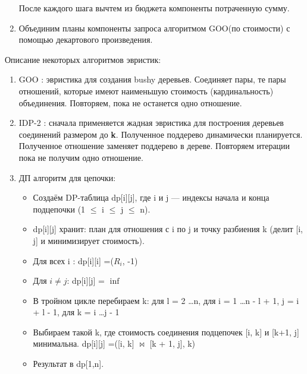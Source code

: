 \documentclass[12pt]{article}
\begin{document}
\begin{flushleft}
\begin{enumerate}
    После каждого шага вычтем из бюджета компоненты потраченную сумму.
    \item Объединим планы компоненты запроса алгоритмом GOO(по стоимости) с помощью декартового произведения.
\end{enumerate}


Описание некоторых алгоритмов эвристик:
\begin{enumerate}
    \item GOO \cite{MoerGOO}: эвристика для создания bushy деревьев. Соединяет пары, те пары отношений, которые имеют наименьшую стоимость (кардинальность) объединения. 
    Повторяем, пока не останется одно отношение.
    \item IDP-2 \cite{IDP}: сначала применяется жадная эвристика для построения деревьев соединений размером до \textbf{k}. 
    Полученное поддерево динамически планируется. Полученное отношение заменяет поддерево в дереве. Повторяем итерации пока не получим одно отношение.
    \item ДП алгоритм для цепочки: 
    \begin{itemize}[label={}]
        \item Создаём DP-таблица dp[i][j], где i и j — индексы начала и конца подцепочки (1 $\le$ i $\le$ j $\le$ n).
        \item dp[i][j] хранит: план для отношения с i по j и точку разбиения k (делит [i, j] и минимизирует стоимость).
        \item Для всех i : dp[i][i] =($R_i$, -1)
        \item Для $i \ne j$: dp[i][j] = $\inf$
        \item В тройном цикле перебираем k: для l = 2 \dots n, для i = 1 \dots n - l + 1, j = i + l - 1, для k = i \dots j - 1
        \item Выбираем такой k, где стоимость соединения подцепочек [i, k] и [k+1, j] минимальна. dp[i][j] =([i, k] $\bowtie$ [k + 1, j], k)
        \item Результат в dp[1,n].
    \end{itemize}
\end{enumerate}

\centering 

\raggedright

\end{flushleft}
\end{document}
